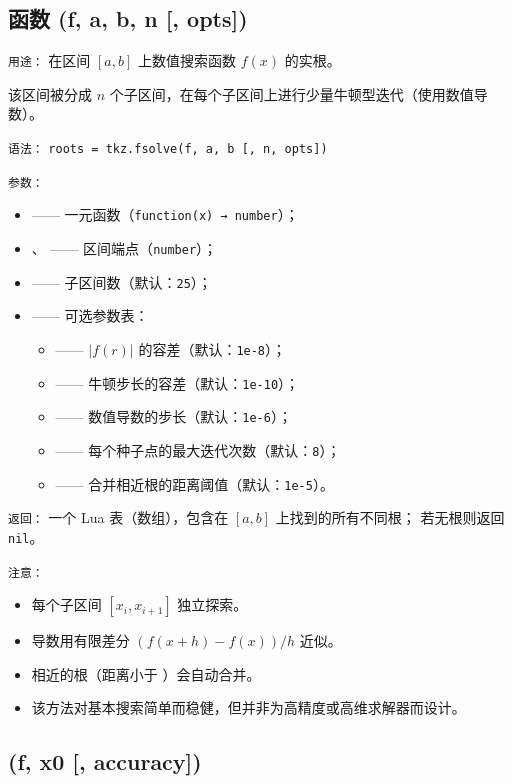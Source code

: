 \subsection{函数 (f, a, b, n [, opts])}
\label{sub:fsolve}

\texttt{用途：}
在区间 \([a,b]\) 上数值搜索函数 \( f(x) \) 的实根。

该区间被分成 \( n \) 个子区间，在每个子区间上进行少量牛顿型迭代（使用数值导数）。

\medskip
\texttt{语法：}
\verb|roots = tkz.fsolve(f, a, b [, n, opts])|

\medskip
\texttt{参数：}
\begin{itemize}
  \item {} —— 一元函数（\texttt{function(x) → number}）；
  \item {}、 —— 区间端点（\texttt{number}）；
  \item {} —— 子区间数（默认：\texttt{25}）；
  \item {} —— 可选参数表：
  \begin{itemize}
    \item {} —— \(|f(r)|\) 的容差（默认：\texttt{1e-8}）；
    \item {} —— 牛顿步长的容差（默认：\texttt{1e-10}）；
    \item {} —— 数值导数的步长（默认：\texttt{1e-6}）；
    \item {} —— 每个种子点的最大迭代次数（默认：\texttt{8}）；
    \item {} —— 合并相近根的距离阈值（默认：\texttt{1e-5}）。
  \end{itemize}
\end{itemize}

\medskip
\texttt{返回：}
一个 Lua 表（数组），包含在 \([a,b]\) 上找到的所有不同根；
若无根则返回 \texttt{nil}。


\medskip
\texttt{注意：}
\begin{itemize}
  \item 每个子区间 \([x_i, x_{i+1}]\) 独立探索。
  \item 导数用有限差分
        \((f(x+h)-f(x))/h\) 近似。
  \item 相近的根（距离小于 ）会自动合并。
  \item 该方法对基本搜索简单而稳健，但并非为高精度或高维求解器而设计。
\end{itemize}


\subsection{(f, x0 [, accuracy])}
\label{sub:derivative}

